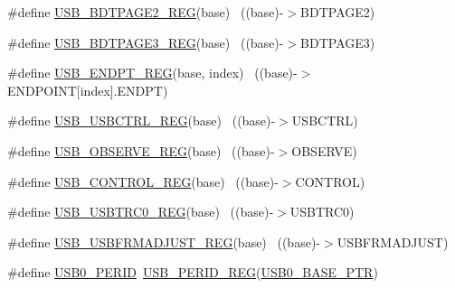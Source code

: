 \begin{DoxyCompactItemize}
\item 
\#define \hyperlink{group___u_s_b___register___accessor___macros_gaa6efc82627e2983372a9cafa08d3e646}{U\+S\+B\+\_\+\+B\+D\+T\+P\+A\+G\+E2\+\_\+\+R\+EG}(base)                                  ~((base)-\/$>$B\+D\+T\+P\+A\+G\+E2)
\item 
\#define \hyperlink{group___u_s_b___register___accessor___macros_ga2b3f2b53d240a5769557b3bf86c2e3ea}{U\+S\+B\+\_\+\+B\+D\+T\+P\+A\+G\+E3\+\_\+\+R\+EG}(base)                                  ~((base)-\/$>$B\+D\+T\+P\+A\+G\+E3)
\item 
\#define \hyperlink{group___u_s_b___register___accessor___macros_ga2d64e95d192db6bf8f035cc6a7cf48d6}{U\+S\+B\+\_\+\+E\+N\+D\+P\+T\+\_\+\+R\+EG}(base,  index)                            ~((base)-\/$>$E\+N\+D\+P\+O\+I\+NT\mbox{[}index\mbox{]}.E\+N\+D\+PT)
\item 
\#define \hyperlink{group___u_s_b___register___accessor___macros_ga73ac0c0c60bf6fd8e2ed9dee3f2aa436}{U\+S\+B\+\_\+\+U\+S\+B\+C\+T\+R\+L\+\_\+\+R\+EG}(base)                                    ~((base)-\/$>$U\+S\+B\+C\+T\+RL)
\item 
\#define \hyperlink{group___u_s_b___register___accessor___macros_ga2ee1aa6fd76b49402bf4a1799687e944}{U\+S\+B\+\_\+\+O\+B\+S\+E\+R\+V\+E\+\_\+\+R\+EG}(base)                                    ~((base)-\/$>$O\+B\+S\+E\+R\+VE)
\item 
\#define \hyperlink{group___u_s_b___register___accessor___macros_ga9c4c4c5d0d19933e8c0ab5ac5dfe48a5}{U\+S\+B\+\_\+\+C\+O\+N\+T\+R\+O\+L\+\_\+\+R\+EG}(base)                                    ~((base)-\/$>$C\+O\+N\+T\+R\+OL)
\item 
\#define \hyperlink{group___u_s_b___register___accessor___macros_gaf054f3a4251da894e8431bb28eceaa6e}{U\+S\+B\+\_\+\+U\+S\+B\+T\+R\+C0\+\_\+\+R\+EG}(base)                                    ~((base)-\/$>$U\+S\+B\+T\+R\+C0)
\item 
\#define \hyperlink{group___u_s_b___register___accessor___macros_ga7976793373bcef48e82870e9391f7f55}{U\+S\+B\+\_\+\+U\+S\+B\+F\+R\+M\+A\+D\+J\+U\+S\+T\+\_\+\+R\+EG}(base)                          ~((base)-\/$>$U\+S\+B\+F\+R\+M\+A\+D\+J\+U\+ST)
\item 
\#define \hyperlink{group___u_s_b___register___accessor___macros_gabee4af6581d4520bd5d8d823d8668889}{U\+S\+B0\+\_\+\+P\+E\+R\+ID}~\hyperlink{group___u_s_b___register___accessor___macros_gaf7ac61d8729d7357b45ebb18042334e5}{U\+S\+B\+\_\+\+P\+E\+R\+I\+D\+\_\+\+R\+EG}(\hyperlink{group___u_s_b___peripheral_ga598ff5eb20a0551af232710b3f27640a}{U\+S\+B0\+\_\+\+B\+A\+S\+E\+\_\+\+P\+TR})

\end{DoxyCompactItemize}
